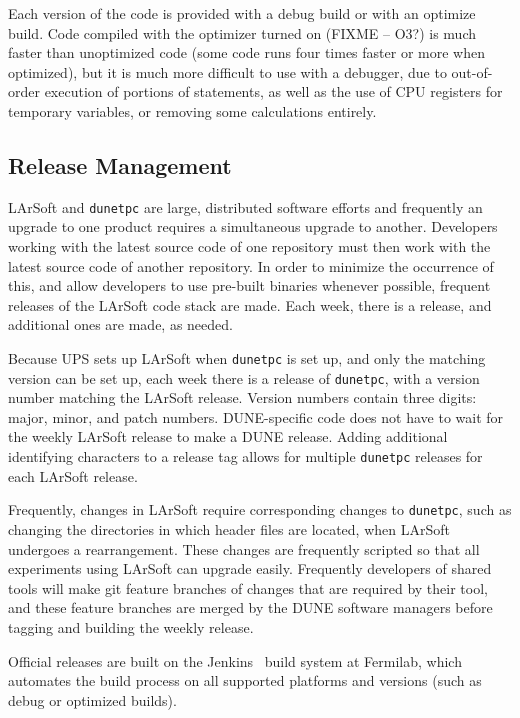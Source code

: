 Each version of the code is provided with a debug build or with an optimize build.  Code compiled with
the optimizer turned on (FIXME -- O3?) is much faster than unoptimized code (some code runs four times faster
or more when optimized), but it is much more difficult to use with a debugger, due to out-of-order execution
of portions of statements, as well as the use of CPU registers for temporary variables, or removing some
calculations entirely.

\subsection{Release Management}

LArSoft and {\tt dunetpc} are large, distributed software efforts and frequently an upgrade to one product
requires a simultaneous upgrade to another.  Developers working with the latest source code of one repository
must then work with the latest source code of another repository.  In order to minimize the occurrence of this,
and allow developers to use pre-built binaries whenever possible, frequent releases of the LArSoft code stack
are made.  Each week, there is a release, and additional ones are made, as needed.

Because UPS sets up LArSoft when {\tt dunetpc} is set up, and only the matching version can be set up,
each week there is a release of {\tt dunetpc}, with a version number matching the LArSoft release.  Version
numbers contain three digits: major, minor, and patch numbers.  DUNE-specific code does not have to wait
for the weekly LArSoft release to make a DUNE release.  Adding additional identifying characters to a release
tag allows for multiple {\tt dunetpc} releases for each LArSoft release.

Frequently, changes in LArSoft require corresponding changes to {\tt dunetpc}, such as changing the directories
in which header files are located, when LArSoft undergoes a rearrangement.  These changes are frequently scripted
so that all experiments using LArSoft can upgrade easily.  Frequently developers of shared tools will make git
feature branches of changes that are required by their tool, and these feature branches are merged by the
DUNE software managers before tagging and building the weekly release.

Official releases are built on the Jenkins~\cite{jenkins} build system at Fermilab, which automates the
build process on all supported platforms and versions (such as debug or optimized builds).

